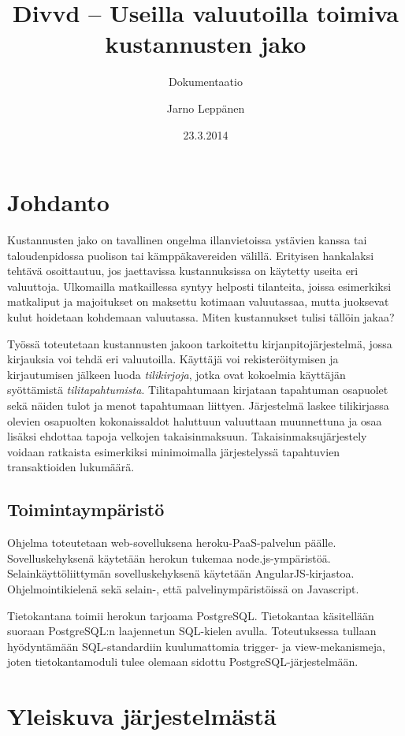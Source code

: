 \documentclass[a4paper]{scrartcl}
\author{Jarno Leppänen}
\title{Divvd -- Useilla valuutoilla toimiva kustannusten jako}
\subtitle{Dokumentaatio}
\date{23.3.2014}
\begin{document}
\maketitle

\section{Johdanto}

Kustannusten jako on tavallinen ongelma illanvietoissa ystävien
kanssa tai taloudenpidossa puolison tai kämppäkavereiden välillä. Erityisen
hankalaksi tehtävä osoittautuu, jos jaettavissa kustannuksissa on käytetty
useita eri valuuttoja. Ulkomailla matkaillessa syntyy helposti tilanteita,
joissa esimerkiksi matkaliput ja majoitukset on maksettu kotimaan valuutassaa,
mutta juoksevat kulut hoidetaan kohdemaan valuutassa. Miten kustannukset
tulisi tällöin jakaa?

Työssä toteutetaan kustannusten jakoon tarkoitettu kirjanpitojärjestelmä, jossa
kirjauksia voi tehdä eri valuutoilla. Käyttäjä voi rekisteröitymisen ja
kirjautumisen jälkeen luoda \textit{tilikirjoja}, jotka ovat kokoelmia
käyttäjän syöttämistä \textit{tilitapahtumista}. Tilitapahtumaan kirjataan
tapahtuman osapuolet sekä näiden tulot ja menot tapahtumaan liittyen.
Järjestelmä laskee tilikirjassa olevien osapuolten kokonaissaldot haluttuun
valuuttaan muunnettuna ja osaa lisäksi ehdottaa tapoja velkojen
takaisinmaksuun. Takaisinmaksujärjestely voidaan ratkaista esimerkiksi
minimoimalla järjestelyssä tapahtuvien transaktioiden
lukumäärä\cite{verhoeff2004settling}.

\subsection{Toimintaympäristö}

Ohjelma toteutetaan web-sovelluksena heroku-PaaS-palvelun päälle.
Sovelluskehyksenä käytetään herokun tukemaa node.js-ympäristöä.
Selainkäyttöliittymän sovelluskehyksenä käytetään AngularJS-kirjastoa.
Ohjelmointikielenä sekä selain-, että palvelinympäristöissä on Javascript.

Tietokantana toimii herokun tarjoama PostgreSQL. Tietokantaa käsitellään
suoraan Postgre\-SQL:n laajennetun SQL-kielen avulla. Toteutuksessa tullaan
hyödyntämään SQL-standardiin kuulumattomia trigger- ja view-mekanismeja, joten
tietokantamoduli tulee olemaan sidottu Post\-gre\-SQL-jär\-jes\-tel\-mään.

\section{Yleiskuva järjestelmästä}
\end{document}
